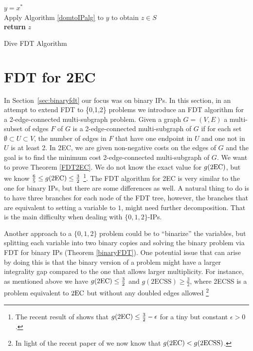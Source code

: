 	\begin{algorithm}[H]\label{FDT-dive}
		$y = x^*$\\
		Apply Algorithm \ref{domtoIPalg} to $y$ to obtain $z\in S$\\
		\textbf{return} $z$
		\caption{Dive FDT Algorithm}
	\end{algorithm}
	



\section{FDT for 2EC}\label{sec:2EC}

In Section~\ref{sec:binaryfdt} our focus was on binary IPs. In this section, in an attempt to extend FDT to \{0,1,2\} problems we introduce an FDT algorithm for a 2-edge-connected multi-subgraph problem. Given a graph $G=(V,E)$ a multi-subset of edges $F$ of $G$ is a 2-edge-connected multi-subgraph of $G$ if for each set $\emptyset\subset U \subset V$, the number of edges in $F$ that have one endpoint in $U$ and one not in $U$ is at least 2. In 2EC, we are given non-negative costs on the edges of $G$ and the goal is to find the minimum cost 2-edge-connected multi-subgraph of $G$. We want to prove Theorem \ref{FDT2EC}.
\FDTEC*
We do not know the exact value for $g(\2ec)$, but we know $\frac{6}{5} \leq g(\2ec) \leq \frac{3}{2}$ \cite{alexander2006integrality,wolsey}\footnote{The recent result of \cite{KKO}  shows that $g(\2ec) \leq \frac{3}{2}-\epsilon$ for a tiny but constant $\epsilon >0$.}. The FDT algorithm for 2EC is very similar to the one for binary IPs, but there are some differences as well. A natural thing to do is to have three branches for each node of the FDT tree, however, the branches that are equivalent to setting a variable to $1$, might need further decomposition. That is the main difficulty when dealing with $\{0,1,2\}$-IPs.

Another approach to a $\{0,1,2\}$ problem could be to ``binarize'' the variables, but splitting each variable into two binary copies and solving the binary problem via FDT for binary IPs (Theorem \ref{binaryFDT}). One potential issue that can arise by doing this is that the binary version of a problem might have a larger integrality gap compared to the one that allows larger multiplicity. For instance, as mentioned above we have $g(\2ec)\leq \frac{3}{2}$ and  $g(\mbox{2ECSS})\geq \frac{3}{2}$, where 2ECSS is a problem equivalent to $\2ec$ but without any doubled edges allowed \cite{32gaptap}\footnote{In light of the recent paper of \cite{KKO} we now know that $g(\2ec)< g(\mbox{2ECSS})$.}

